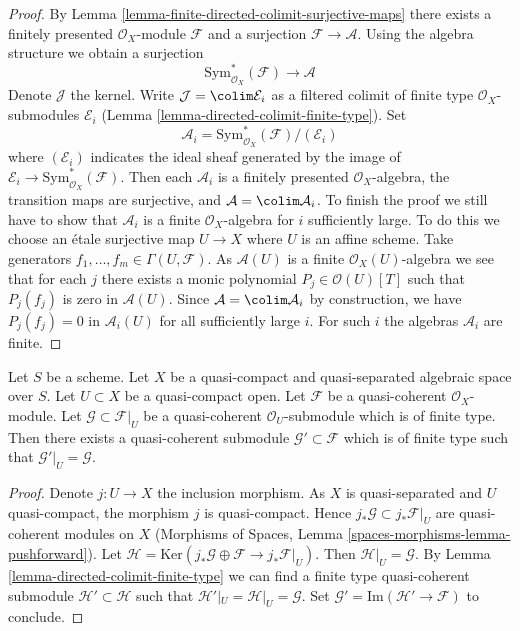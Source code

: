 \begin{proof}
By Lemma \ref{lemma-finite-directed-colimit-surjective-maps}
there exists a finitely presented $\mathcal{O}_X$-module
$\mathcal{F}$ and a surjection $\mathcal{F} \to \mathcal{A}$.
Using the algebra structure we obtain a surjection
$$
\text{Sym}^*_{\mathcal{O}_X}(\mathcal{F}) \longrightarrow \mathcal{A}
$$
Denote $\mathcal{J}$ the kernel. Write $\mathcal{J} = \colim \mathcal{E}_i$
as a filtered colimit of finite type $\mathcal{O}_X$-submodules
$\mathcal{E}_i$ (Lemma \ref{lemma-directed-colimit-finite-type}). Set
$$
\mathcal{A}_i = \text{Sym}^*_{\mathcal{O}_X}(\mathcal{F})/(\mathcal{E}_i)
$$
where $(\mathcal{E}_i)$ indicates the ideal sheaf generated by
the image of $\mathcal{E}_i \to \text{Sym}^*_{\mathcal{O}_X}(\mathcal{F})$.
Then each $\mathcal{A}_i$ is a finitely presented $\mathcal{O}_X$-algebra,
the transition maps are surjective, and $\mathcal{A} = \colim \mathcal{A}_i$.
To finish the proof we still
have to show that $\mathcal{A}_i$ is a finite $\mathcal{O}_X$-algebra
for $i$ sufficiently large. To do this we choose an \'etale surjective
map $U \to X$ where $U$ is an affine scheme. Take generators
$f_1, \ldots, f_m \in \Gamma(U, \mathcal{F})$.
As $\mathcal{A}(U)$ is a finite $\mathcal{O}_X(U)$-algebra we
see that for each $j$ there exists a monic polynomial
$P_j \in \mathcal{O}(U)[T]$ such that $P_j(f_j)$ is zero in $\mathcal{A}(U)$.
Since $\mathcal{A} = \colim \mathcal{A}_i$ by construction, we
have $P_j(f_j) = 0$ in $\mathcal{A}_i(U)$ for all sufficiently large $i$.
For such $i$ the algebras $\mathcal{A}_i$ are finite.
\end{proof}

\begin{lemma}
\label{lemma-extend}
Let $S$ be a scheme.
Let $X$ be a quasi-compact and quasi-separated algebraic space over $S$.
Let $U \subset X$ be a quasi-compact open.
Let $\mathcal{F}$ be a quasi-coherent $\mathcal{O}_X$-module.
Let $\mathcal{G} \subset \mathcal{F}|_U$ be a quasi-coherent
$\mathcal{O}_U$-submodule which is of finite type. Then
there exists a quasi-coherent submodule $\mathcal{G}' \subset \mathcal{F}$
which is of finite type such that $\mathcal{G}'|_U = \mathcal{G}$.
\end{lemma}

\begin{proof}
Denote $j : U \to X$ the inclusion morphism. As $X$ is quasi-separated
and $U$ quasi-compact, the morphism $j$ is quasi-compact. Hence
$j_*\mathcal{G} \subset j_*\mathcal{F}|_U$ are quasi-coherent modules
on $X$ (Morphisms of Spaces, Lemma
\ref{spaces-morphisms-lemma-pushforward}).
Let $\mathcal{H} =
\text{Ker}(j_*\mathcal{G} \oplus \mathcal{F} \to j_*\mathcal{F}|_U)$.
Then $\mathcal{H}|_U = \mathcal{G}$. By
Lemma \ref{lemma-directed-colimit-finite-type}
we can find a finite type quasi-coherent submodule
$\mathcal{H}' \subset \mathcal{H}$ such that
$\mathcal{H}'|_U = \mathcal{H}|_U = \mathcal{G}$.
Set $\mathcal{G}' = \text{Im}(\mathcal{H}' \to \mathcal{F})$
to conclude.
\end{proof}



